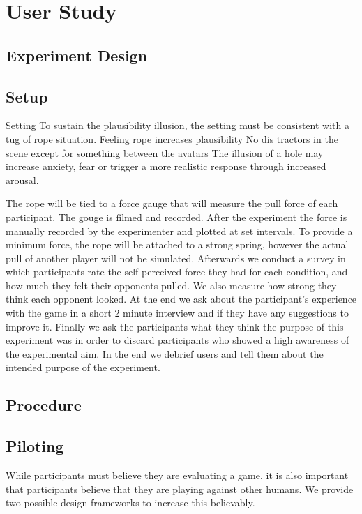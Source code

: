 
\section{User Study}

\subsection{Experiment Design}
\subsection{Setup}
Setting 
To sustain the plausibility illusion, the setting must be consistent with a tug of rope situation.
Feeling rope increases plausibility
No dis tractors in the scene except for something between the avatars
The illusion of a hole may increase anxiety, fear or trigger a more realistic response through increased arousal.



The rope will be tied to a force gauge that will measure the pull force of each participant. The gouge is filmed and recorded. After the experiment the force is manually recorded by the experimenter and plotted at set intervals. To provide a minimum force, the rope will be attached to a strong spring, however the actual pull of another player will not be simulated. 
Afterwards we conduct a survey in which participants rate the self-perceived force they had for each condition, and how much they felt their opponents pulled. We also measure how strong they think each opponent looked. 
At the end we ask about the participant’s experience with the game in a short 2 minute interview and if they have any suggestions to improve it. Finally we ask the participants what they think the purpose of this experiment was in order to discard participants who showed a high awareness of the experimental aim. In the end we debrief users and tell them about the intended purpose of the experiment.

\subsection{Procedure}
\subsection{Piloting}
While participants must believe they are evaluating a game, it is also important that participants believe that they are playing against other humans. We provide two possible design frameworks to increase this believably. 

